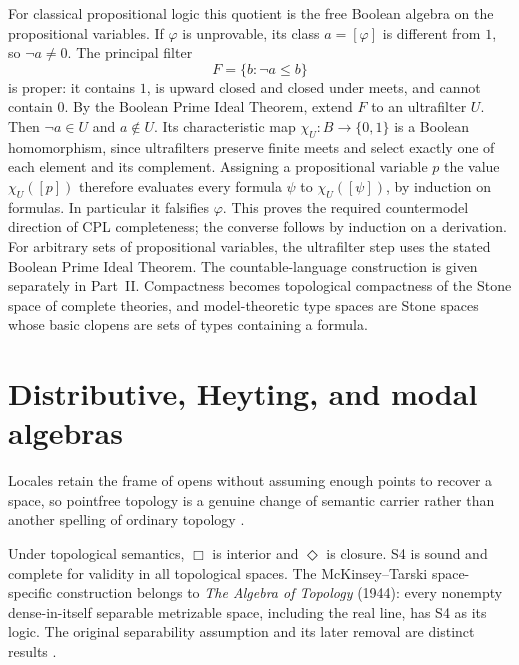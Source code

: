 For classical propositional logic this quotient is the free Boolean algebra on
the propositional variables. If \(\varphi\) is unprovable, its class
\(a=[\varphi]\) is different from \(1\), so \(\neg a\ne0\).
The principal filter
\[
 F=\{b:\neg a\leq b\}
\]
is proper: it contains \(1\), is upward closed and closed under meets,
and cannot contain \(0\).
By the Boolean Prime Ideal Theorem, extend \(F\) to an ultrafilter \(U\).
Then \(\neg a\in U\) and \(a\notin U\).
Its characteristic map \(\chi_U:B\to\{0,1\}\) is a Boolean
homomorphism, since ultrafilters preserve finite meets and select
exactly one of each element and its complement.
Assigning a propositional variable \(p\) the value \(\chi_U([p])\)
therefore evaluates every formula \(\psi\) to \(\chi_U([\psi])\),
by induction on formulas. In particular it falsifies \(\varphi\).
This proves the required countermodel direction of CPL completeness;
the converse follows by induction on a derivation.
For arbitrary sets of propositional variables, the ultrafilter step
uses the stated Boolean Prime Ideal Theorem. The countable-language
construction is given separately in Part~II.
Compactness becomes topological compactness of the Stone space of complete
theories, and model-theoretic type spaces are Stone spaces whose basic clopens
are sets of types containing a formula.

\section{Distributive, Heyting, and modal algebras}
\label{sec:p10-nonclassical-algebras}







Locales retain the frame of opens without assuming enough points to recover a
space, so pointfree topology is a genuine change of semantic carrier rather
than another spelling of ordinary topology \cite{Johnstone1982}.





Under topological semantics, \(\Box\) is interior and \(\Diamond\) is
closure. S4 is sound and complete for validity in all topological spaces.
The McKinsey--Tarski space-specific construction belongs to
\emph{The Algebra of Topology} (1944): every nonempty dense-in-itself
separable metrizable space, including the real line, has S4 as its logic.
The original separability assumption and its later removal are distinct
results \cite{McKinseyTarski1944Topology,BezhanishviliEtAl2017NewMT}.


